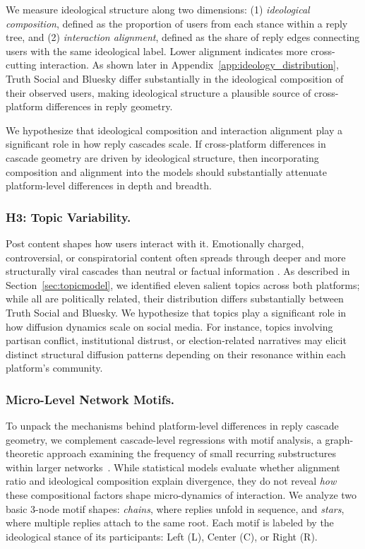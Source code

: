 \documentclass[letterpaper]{article} %
\begin{document}
We measure ideological structure along two dimensions: (1) \textit{ideological composition}, defined as the proportion of users from each stance within a reply tree, and (2) \textit{interaction alignment}, defined as the share of reply edges connecting users with the same ideological label. Lower alignment indicates more cross-cutting interaction. As shown later in Appendix~\ref{app:ideology_distribution}, Truth Social and Bluesky differ substantially in the ideological composition of their observed users, making ideological structure a plausible source of cross-platform differences in reply geometry.

We hypothesize that ideological composition and interaction alignment play a significant role in how reply cascades scale. If cross-platform differences in cascade geometry are driven by ideological structure, then incorporating composition and alignment into the models should substantially attenuate platform-level differences in depth and breadth.

\subsubsection{H3: Topic Variability.}
Post content shapes how users interact with it. Emotionally charged, controversial, or conspiratorial content often spreads through deeper and more structurally viral cascades than neutral or factual information \cite{vosoughi_spread_2018, wang_factors_2022}. As described in Section~\ref{sec:topicmodel}, we identified eleven salient topics across both platforms; while all are politically related, their distribution differs substantially between Truth Social and Bluesky. We hypothesize that topics play a significant role in how diffusion dynamics scale on social media. For instance, topics involving partisan conflict, institutional distrust, or election-related narratives may elicit distinct structural diffusion patterns depending on their resonance within each platform's community. 

\subsubsection{Micro-Level Network Motifs.}
To unpack the mechanisms behind platform-level differences in reply cascade geometry, we complement cascade-level regressions with motif analysis, a graph-theoretic approach examining the frequency of small recurring substructures within larger networks~\cite{alon_network_2007}. While statistical models evaluate whether alignment ratio and ideological composition explain divergence, they do not reveal \textit{how} these compositional factors shape micro-dynamics of interaction. We analyze two basic 3-node motif shapes: \textit{chains}, where replies unfold in sequence, and \textit{stars}, where multiple replies attach to the same root. Each motif is labeled by the ideological stance of its participants: Left (L), Center (C), or Right (R).
\end{document}
